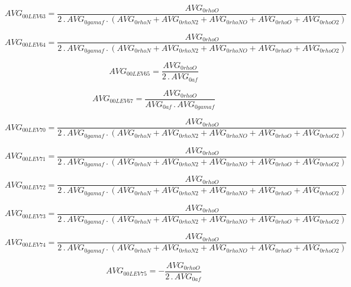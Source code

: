 \documentclass{article}
\begin{document}
\begin{dmath}AVG_{0 0 LEV 63} = \frac{AVG_{0 rhoO}}{2 \,.\, AVG_{0 gamaf} \,.\, \left(AVG_{0 rhoN} + AVG_{0 rhoN2} + AVG_{0 rhoNO} + AVG_{0 rhoO} + AVG_{0 rhoO2}\right)}\end{dmath}

\begin{dmath}AVG_{0 0 LEV 64} = \frac{AVG_{0 rhoO}}{2 \,.\, AVG_{0 gamaf} \,.\, \left(AVG_{0 rhoN} + AVG_{0 rhoN2} + AVG_{0 rhoNO} + AVG_{0 rhoO} + AVG_{0 rhoO2}\right)}\end{dmath}

\begin{dmath}AVG_{0 0 LEV 65} = \frac{AVG_{0 rhoO}}{2 \,.\, AVG_{0 af}}\end{dmath}

\begin{dmath}AVG_{0 0 LEV 67} = \frac{AVG_{0 rhoO}}{AVG_{0 af} \,.\, AVG_{0 gamaf}}\end{dmath}

\begin{dmath}AVG_{0 0 LEV 70} = \frac{AVG_{0 rhoO}}{2 \,.\, AVG_{0 gamaf} \,.\, \left(AVG_{0 rhoN} + AVG_{0 rhoN2} + AVG_{0 rhoNO} + AVG_{0 rhoO} + AVG_{0 rhoO2}\right)}\end{dmath}

\begin{dmath}AVG_{0 0 LEV 71} = \frac{AVG_{0 rhoO}}{2 \,.\, AVG_{0 gamaf} \,.\, \left(AVG_{0 rhoN} + AVG_{0 rhoN2} + AVG_{0 rhoNO} + AVG_{0 rhoO} + AVG_{0 rhoO2}\right)}\end{dmath}

\begin{dmath}AVG_{0 0 LEV 72} = \frac{AVG_{0 rhoO}}{2 \,.\, AVG_{0 gamaf} \,.\, \left(AVG_{0 rhoN} + AVG_{0 rhoN2} + AVG_{0 rhoNO} + AVG_{0 rhoO} + AVG_{0 rhoO2}\right)}\end{dmath}

\begin{dmath}AVG_{0 0 LEV 73} = \frac{AVG_{0 rhoO}}{2 \,.\, AVG_{0 gamaf} \,.\, \left(AVG_{0 rhoN} + AVG_{0 rhoN2} + AVG_{0 rhoNO} + AVG_{0 rhoO} + AVG_{0 rhoO2}\right)}\end{dmath}

\begin{dmath}AVG_{0 0 LEV 74} = \frac{AVG_{0 rhoO}}{2 \,.\, AVG_{0 gamaf} \,.\, \left(AVG_{0 rhoN} + AVG_{0 rhoN2} + AVG_{0 rhoNO} + AVG_{0 rhoO} + AVG_{0 rhoO2}\right)}\end{dmath}

\begin{dmath}AVG_{0 0 LEV 75} = - \frac{AVG_{0 rhoO}}{2 \,.\, AVG_{0 af}}\end{dmath}
\end{document}
